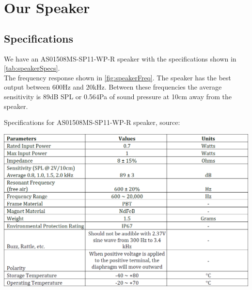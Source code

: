 \documentclass[12pt, a4paper]{article}
\begin{document}
	\section{Our Speaker}
	\subsection{Specifications}
	
	We have an AS01508MS-SP11-WP-R speaker with the specifications shown in \ref{tab:speakerSpecs}.\\
	The frequency response shown in \ref{fig:speakerFreq}. The speaker has the best output between 600Hz and 20kHz. Between these frequencies the average sensitivity is 89dB SPL or 0.564Pa of sound pressure at 10cm away from the speaker. 
	
	\begin{table}[!htb]
		\caption{Specifications for AS01508MS-SP11-WP-R speaker, source: \cite{speakerDatasheet}}
		\includegraphics[width=\textwidth]{./Figures/speaker_specifications}
		\label{tab:speakerSpecs} 
	\end{table} 
	
\end{document}
